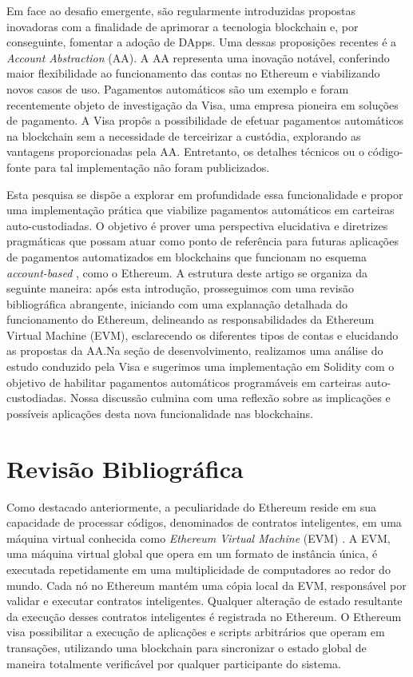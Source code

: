 \documentclass[12pt]{article}
\begin{document}
Em face ao desafio emergente, são regularmente introduzidas propostas inovadoras com a finalidade
de aprimorar a tecnologia blockchain e, por conseguinte, fomentar a adoção de DApps. Uma dessas
proposições recentes é a \textit{Account Abstraction} (AA)\cite{5}. A AA representa uma inovação
notável, conferindo maior flexibilidade ao funcionamento das contas no Ethereum e viabilizando
novos casos de uso. Pagamentos automáticos são um exemplo e foram recentemente objeto de
investigação da Visa, uma empresa pioneira em soluções de pagamento. A Visa propôs a possibilidade
de efetuar pagamentos automáticos na blockchain sem a necessidade de terceirizar a custódia,
explorando as vantagens proporcionadas pela AA\cite{9}. Entretanto, os detalhes técnicos ou o
código-fonte para tal implementação não foram publicizados.

Esta pesquisa se dispõe a explorar em profundidade essa funcionalidade e propor uma implementação
prática que viabilize pagamentos automáticos em carteiras auto-custodiadas. O objetivo é prover uma
perspectiva elucidativa e diretrizes pragmáticas que possam atuar como ponto de referência para
futuras aplicações de pagamentos automatizados em blockchains que funcionam no esquema
\textit{account-based} \cite{20}, como o Ethereum. A estrutura deste artigo se organiza da seguinte
maneira: após esta introdução, prosseguimos com uma revisão bibliográfica abrangente, iniciando com
uma explanação detalhada do funcionamento do Ethereum, delineando as responsabilidades da Ethereum
Virtual Machine (EVM), esclarecendo os diferentes tipos de contas e elucidando as propostas da
AA.Na seção de desenvolvimento, realizamos uma análise do estudo conduzido pela Visa e sugerimos
uma implementação em Solidity com o objetivo de habilitar pagamentos automáticos programáveis em
carteiras auto-custodiadas. Nossa discussão culmina com uma reflexão sobre as implicações e
possíveis aplicações desta nova funcionalidade nas blockchains.

\section{Revisão Bibliográfica}\label{sec:revisao}

Como destacado anteriormente, a peculiaridade do Ethereum reside em sua capacidade de processar
códigos, denominados de contratos inteligentes, em uma máquina virtual conhecida como
\textit{Ethereum Virtual Machine} (EVM) \cite{13}. A EVM, uma máquina virtual global que opera em
um formato de instância única, é executada repetidamente em uma multiplicidade de computadores ao
redor do mundo. Cada nó no Ethereum mantém uma cópia local da EVM, responsável por validar e
executar contratos inteligentes. Qualquer alteração de estado resultante da execução desses
contratos inteligentes é registrada no Ethereum\cite{6}. O Ethereum visa possibilitar a execução de
aplicações e scripts arbitrários que operam em transações, utilizando uma blockchain para
sincronizar o estado global de maneira totalmente verificável por qualquer participante do
sistema\cite{13}.
\end{document}
